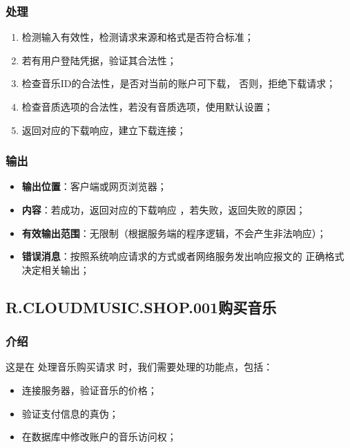 \subsubsection{处理}
	\begin{enumerate}
		\item 检测输入有效性，检测请求来源和格式是否符合标准；
		\item 若有用户登陆凭据，验证其合法性；
		\item 检查音乐ID的合法性，是否对当前的账户可下载，
			否则，拒绝下载请求；
		\item 检查音质选项的合法性，若没有音质选项，使用默认设置；
		\item 返回对应的下载响应，建立下载连接；
	\end{enumerate}
\subsubsection{输出}
\begin{itemize}
	\item \textbf{输出位置}：客户端或网页浏览器；
	\item \textbf{内容}：若成功，返回对应的下载响应 ，若失败，返回失败的原因；
	\item \textbf{有效输出范围}：无限制（根据服务端的程序逻辑，不会产生非法响应）；
	\item \textbf{错误消息}：按照系统响应请求的方式或者网络服务发出响应报文的
		正确格式决定相关输出；
\end{itemize}

\subsection{R.CLOUDMUSIC.SHOP.001购买音乐}
\subsubsection{介绍}
	这是在 处理音乐购买请求 时，我们需要处理的功能点，包括：
	\begin{itemize}
		\item 连接服务器，验证音乐的价格；
		\item 验证支付信息的真伪；
		\item 在数据库中修改账户的音乐访问权；
	\end{itemize}
